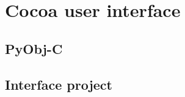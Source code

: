 \section{Cocoa user interface}\label{sec:cocoa}
\subsection{PyObj-C}
\subsection{Interface project}
